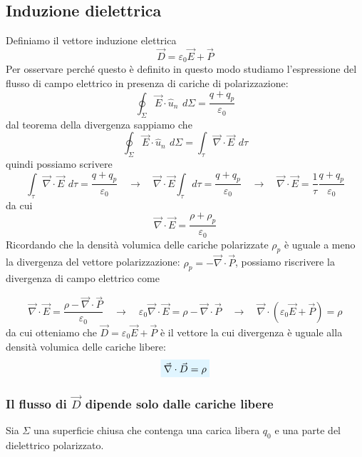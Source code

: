 \documentclass[x11names]{report}
\begin{document}
\subsection{Induzione dielettrica}
Definiamo il vettore induzione elettrica
\[
\vec{D} = \varepsilon_0\vec{E} + \vec{P	}
\]
Per osservare perché questo è definito in questo modo studiamo l'espressione del flusso di campo elettrico in presenza di cariche di polarizzazione:
\[
\oint_{\Sigma} \vec{E} \cdot \hat{u}_n \,\ d\Sigma = \frac{q + q_p}{\varepsilon_0}
\]
dal teorema della divergenza sappiamo che 
\[
\oint_{\Sigma}\vec{E} \cdot \hat{u}_n \,\ d\Sigma = \int_{\tau} \vec{\nabla}\cdot \vec{E} \,\ d\tau
\]
quindi possiamo scrivere
\[
\int_{\tau} \vec{\nabla}\cdot \vec{E} \,\ d\tau = \frac{q + q_p}{\varepsilon_0} \quad \to \quad \vec{\nabla}\cdot \vec{E} \int_{\tau}  d\tau = \frac{q + q_p}{\varepsilon_0} \quad \to \quad \vec{\nabla}\cdot \vec{E} = \frac{1}{\tau}  \frac{q + q_p}{\varepsilon_0}
\]
da cui
\[
\vec{\nabla}\cdot \vec{E} = \frac{\rho + \rho_p}{\varepsilon_0}
\]
Ricordando che la densità volumica delle cariche polarizzate \(\rho_p\) è uguale a meno la divergenza del vettore polarizzazione: \(\rho_p = - \vec{\nabla}\cdot \vec{P}\), possiamo riscrivere la divergenza di campo elettrico come

\[
\vec{\nabla}\cdot \vec{E} = \frac{\rho - \vec{\nabla}\cdot \vec{P}}{\varepsilon_0}  \quad \to \quad \varepsilon_0\vec{\nabla}\cdot \vec{E} = \rho - \vec{\nabla}\cdot \vec{P} \quad \to \quad \vec{\nabla} \cdot \left(\varepsilon_0\vec{E} + \vec{P}\right) = \rho
\]
da cui otteniamo che \(\vec{D} = \varepsilon_0\vec{E} + \vec{P}\) è il vettore la cui divergenza è uguale alla densità volumica delle cariche libere:
\begin{equation}
	\viola{\vec{\nabla} \cdot \vec{D}= \rho} 
\end{equation}

\subsubsection{Il flusso di \(\vec{D}\) dipende solo dalle cariche libere}
Sia \(\Sigma\) una superficie chiusa che contenga una carica libera \(q_0\) e una parte del dielettrico polarizzato. 
\end{document}
